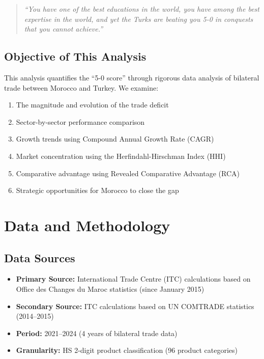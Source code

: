 \documentclass[12pt,a4paper]{article}
\begin{document}
\begin{quote}
\textit{``You have one of the best educations in the world, you have among the best expertise in the world, and yet the Turks are beating you 5-0 in conquests that you cannot achieve.''}
\end{quote}

\subsection{Objective of This Analysis}

This analysis quantifies the ``5-0 score'' through rigorous data analysis of bilateral trade between Morocco and Turkey. We examine:

\begin{enumerate}[label=\arabic*.]
\item The magnitude and evolution of the trade deficit
\item Sector-by-sector performance comparison
\item Growth trends using Compound Annual Growth Rate (CAGR)
\item Market concentration using the Herfindahl-Hirschman Index (HHI)
\item Comparative advantage using Revealed Comparative Advantage (RCA)
\item Strategic opportunities for Morocco to close the gap
\end{enumerate}

\section{Data and Methodology}

\subsection{Data Sources}

\begin{itemize}
\item \textbf{Primary Source:} International Trade Centre (ITC) calculations based on Office des Changes du Maroc statistics (since January 2015)
\item \textbf{Secondary Source:} ITC calculations based on UN COMTRADE statistics (2014--2015)
\item \textbf{Period:} 2021--2024 (4 years of bilateral trade data)
\item \textbf{Granularity:} HS 2-digit product classification (96 product categories)
\end{itemize}
\end{document}
